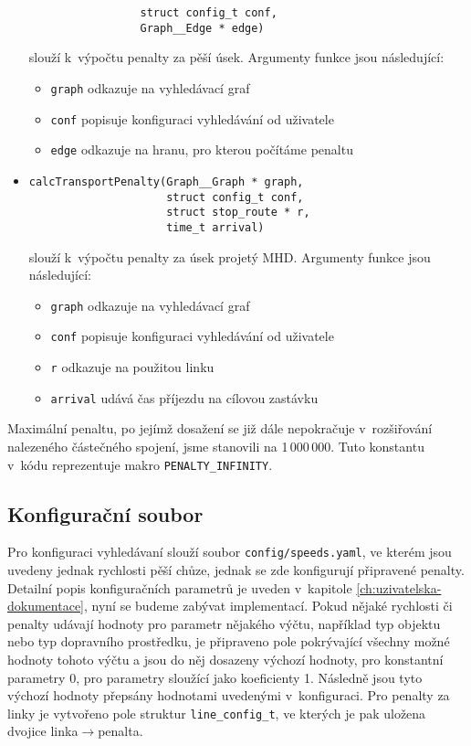 \begin{itemize}
\begin{verbatim}
                 struct config_t conf,
                 Graph__Edge * edge)
    \end{verbatim}
    \vspace*{-0.5cm}
    slouží k~výpočtu penalty za pěší úsek.
	Argumenty funkce jsou následující:
	\begin{itemize}
		\item {\tt graph} odkazuje na vyhledávací graf
		\item {\tt conf} popisuje konfiguraci vyhledávání od uživatele
		\item {\tt edge} odkazuje na hranu, pro kterou počítáme penaltu
	\end{itemize}
	\item \begin{verbatim}calcTransportPenalty(Graph__Graph * graph,
                     struct config_t conf,
                     struct stop_route * r,
                     time_t arrival)
    \end{verbatim}
    \vspace*{-0.5cm}
    slouží k~výpočtu penalty
	za úsek projetý MHD. Argumenty funkce jsou následující:
	\begin{itemize}
		\item {\tt graph} odkazuje na vyhledávací graf
		\item {\tt conf} popisuje konfiguraci vyhledávání od uživatele
		\item {\tt r} odkazuje na použitou linku
		\item {\tt arrival} udává čas příjezdu na cílovou zastávku
	\end{itemize}
\end{itemize}

Maximální penaltu, po jejímž dosažení se již dále nepokračuje v~rozšiřování
nalezeného částečného spojení, jsme stanovili na 1\,000\,000. Tuto konstantu
v~kódu reprezentuje makro {\tt PENALTY\_INFINITY}.

\subsection{Konfigurační soubor}
Pro konfiguraci vyhledávaní slouží soubor {\tt config/speeds.yaml}, ve kterém
jsou uvedeny jednak rychlosti pěší chůze, jednak se zde konfigurují připravené
penalty. Detailní popis konfiguračních parametrů je uveden v~kapitole
\ref{ch:uzivatelska-dokumentace}, nyní se budeme zabývat implementací. Pokud
nějaké rychlosti či penalty udávají hodnoty pro parametr nějakého výčtu,
například typ objektu nebo typ dopravního prostředku, je připraveno pole
pokrývající všechny možné hodnoty tohoto výčtu a jsou do něj dosazeny výchozí
hodnoty, pro konstantní parametry 0, pro parametry sloužící jako koeficienty 1.
Následně jsou tyto výchozí hodnoty přepsány hodnotami uvedenými v~konfiguraci.
Pro penalty za linky je vytvořeno pole struktur {\tt line\_config\_t}, ve
kterých je pak uložena dvojice linka$\rightarrow$penalta. 

